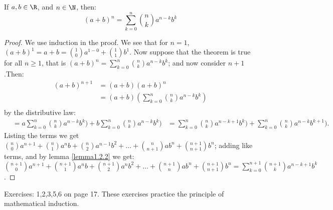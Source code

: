 \begin{theorem}
  If $a,b \in \R$, and $n \in \N$, then:
    \begin{equation}\label{equation1.8}
      (a+b)^n=\sum_{k=0}^{n} {n \choose k}a^{n-k}b^k
    \end{equation}
\end{theorem}
\begin{proof}
  We use induction in the proof. We see that for $n=1$, $(a+b)^1=a+b={1 \choose 0}a^{1-0}+{1 \choose 1}b^1$. Now suppose that 
  the theorem is true for all $n \geq 1$, that is $      (a+b)^n=\sum_{k=0}^{n} {n \choose k}a^{n-k}b^k$; and now consider $n+1$.Then:
    \begin{align}
      (a+b)^{n+1} &= (a+b)(a+b)^n \\
                  &= (a+b)(\sum_{k=0}^{n} {n \choose k}a^{n-k}b^k) \\
    \end{align}
by the distributive law:
    \begin{align}
                  &= a\sum_{k=0}^{n} {n \choose k}a^{n-k}b^k)+b\sum_{k=0}^{n} {n \choose k}a^{n-k}b^k)
                  &=\sum_{k=0}^{n} {n \choose k}a^{n-k+1}b^k)+\sum_{k=0}^{n} {n \choose k}a^{n-k}b^{k+1}).
    \end{align}
Listing the terms we get ${n \choose 0}a^{n+1}+{n \choose 1}a^{n}b+{n \choose 2}a^{n-1}b^2+ \dots + {n \choose n+1}ab^n+{n+1 \choose n+1}b^n$; 
adding like terms, and by lemma \ref{lemma1.2.2} we get: ${n+1 \choose 0}a^{n+1}+{n+1 \choose 1}a^{n}b+{n+1 \choose 2}a^{n}b^2
+ \dots + {n+1 \choose n}ab^n+{n+1 \choose n+1}b^n = \sum_{k=0}^{n+1} {n+1 \choose k}a^{n-k+1}b^k$.
\end{proof}

\begin{HW}
  Exercises: 1,2,3,5,6 on page 17. These exercises practice the principle of mathematical induction.
\end{HW}
